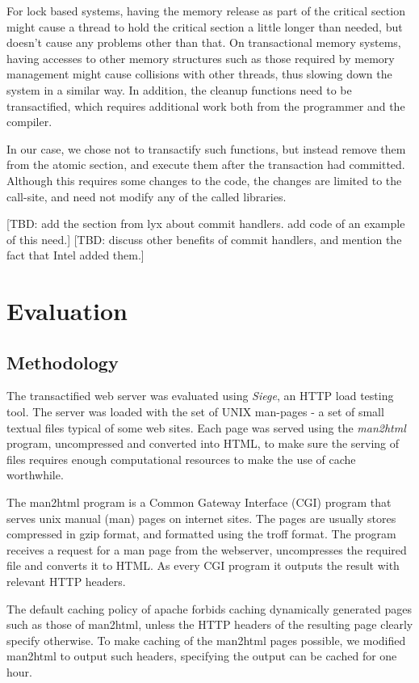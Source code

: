 \documentclass[preprint,natbib,11pt]{sigplanconf}
\begin{document}
For lock based systems, having the memory release as part of the critical
section might cause a thread to hold the critical section a little longer than
needed, but doesn't cause any problems other than that. On transactional memory
systems, having accesses to other memory structures such as those required by
memory management might cause collisions with other threads, thus slowing down
the system in a similar way. In addition, the cleanup functions need to be
transactified, which requires additional work both from the programmer and the
compiler.

In our case, we chose not to transactify such functions, but instead remove them
from the atomic section, and execute them after the transaction had committed.
Although this requires some changes to the code, the changes are limited to the
call-site, and need not modify any of the called libraries.

[TBD: add the section from lyx about commit handlers. add code of an example of
this need.] [TBD: discuss other benefits of commit handlers, and mention the
fact that Intel added them.] 

\section{Evaluation} 
\subsection{Methodology} 
The transactified web server was evaluated using \emph{Siege}\cite{siege}, an HTTP
load testing tool. The server was loaded with the set of UNIX man-pages - a set
of small textual files typical of some web sites. Each page was served using the
\emph{man2html}\cite{man2html} program, uncompressed and converted into HTML, to make
sure the serving of files requires enough computational resources to make the
use of cache worthwhile.

The man2html program is a Common Gateway Interface (CGI) program that serves
unix manual (man) pages on internet sites. The pages are usually stores
compressed in gzip format, and formatted using the troff format. The program
receives a request for a man page from the webserver, uncompresses the required
file and converts it to HTML. As every CGI program it outputs the result with
relevant HTTP headers.

The default caching policy of apache forbids caching dynamically generated pages
such as those of man2html, unless the HTTP headers of the resulting page clearly
specify otherwise. To make caching of the man2html pages possible, we modified
man2html to output such headers, specifying the output can be cached for one
hour.
\end{document}

